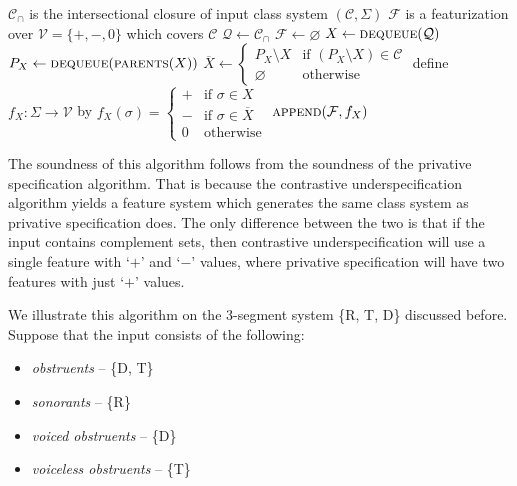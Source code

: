\documentclass[11pt, oneside]{article}   	%
\begin{document}
\vspace{\baselineskip} \noindent \begin{algorithmic}
    \REQUIRE $\mathcal C_\cap$ is the intersectional closure of input class system $(\mathcal C, \Sigma)$
    \ENSURE $\mathcal F$ is a featurization over $\mathcal V = \{ +, -, 0 \}$ which covers $\mathcal C$
    \STATE
    \STATE $\mathcal Q \leftarrow \mathcal C_\cap$
    \STATE $\mathcal F \leftarrow \varnothing$
    \STATE
        \STATE $X \leftarrow \textsc{dequeue}(\mathcal Q)$
            \STATE $P_X \leftarrow \textsc{dequeue}(\textsc{parents}(X))$
            \STATE
            \STATE $\overline{X} \leftarrow \begin{cases}
                P_X \setminus X & \text{if } (P_X \setminus X) \in \mathcal C \\
                \varnothing     & \text{otherwise}
                \end{cases}$
            \STATE
            \STATE define $f_X : \Sigma \rightarrow \mathcal V$ by $f_X (\sigma) = \begin{cases}
                    + & \text{if } \sigma \in X \\
                    - & \text{if } \sigma \in \overline{X} \\
                    0 & \text{otherwise}
                    \end{cases}$
            \STATE $\textsc{append}(\mathcal F, f_X)$
        \ENDIF
    \ENDWHILE
\end{algorithmic}

\vspace{\baselineskip} \noindent The soundness of this algorithm follows from the soundness of the privative specification algorithm. That is because the contrastive underspecification algorithm yields a feature system which generates the same class system as privative specification does. The only difference between the two is that if the input contains complement sets, then contrastive underspecification will use a single feature with `$+$' and `$-$' values, where privative specification will have two features with just `$+$' values.

\vspace{\baselineskip} We illustrate this algorithm on the 3-segment system \{R, T, D\} discussed before. Suppose that the input consists of the following: \begin{itemize}
    \item \textit{obstruents} -- \{D, T\}
    \item \textit{sonorants} -- \{R\}
    \item \textit{voiced obstruents} -- \{D\}
    \item \textit{voiceless obstruents} -- \{T\}
    \end{itemize}
\end{document}
